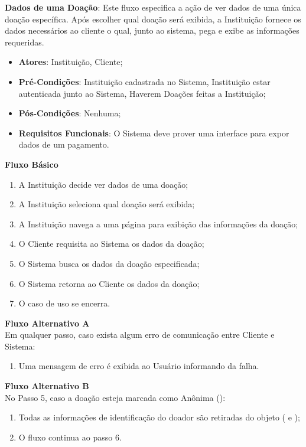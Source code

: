 \begin{lista}
  
  
  \item \textbf{Dados de uma Doação}: Este fluxo especifica a ação de ver dados de uma única doação específica. Após escolher qual doação será exibida, a Instituição fornece os dados necessários ao cliente o qual, junto ao sistema, pega e exibe as informações requeridas.
    \begin{itemize}
    \item \textbf{Atores}: Instituição, Cliente;
    \item \textbf{Pré-Condições}: Instituição cadastrada no Sistema, Instituição estar autenticada junto ao Sistema, Haverem Doações feitas a Instituição;
    \item \textbf{Pós-Condições}: Nenhuma;
    \item \textbf{Requisitos Funcionais}: O Sistema deve prover uma interface para expor dados de um pagamento.
    \end{itemize}
	
    \textbf{Fluxo Básico}
    \begin{enumerate}
    \item A Instituição decide ver dados de uma doação;
    \item A Instituição seleciona qual doação será exibida;
    \item A Instituição navega a uma página para exibição das informações da doação;
    \item O Cliente requisita ao Sistema os dados da doação;
    \item O Sistema busca os dados da doação especificada;
    \item O Sistema retorna ao Cliente os dados da doação;
    \item O caso de uso se encerra.
    \end{enumerate}
    
    \textbf{Fluxo Alternativo A} \\
    Em qualquer passo, caso exista algum erro de comunicação entre Cliente e Sistema:
    \begin{enumerate}
    \item Uma mensagem de erro é exibida ao Usuário informando da falha.
    \end{enumerate}
    
    \textbf{Fluxo Alternativo B} \\
    No Passo 5, caso a doação esteja marcada como Anônima ():
    \begin{enumerate}
    \item Todas as informações de identificação do doador são retiradas do objeto ( e );
    \item O fluxo continua ao passo 6.
    \end{enumerate}
\end{lista}

